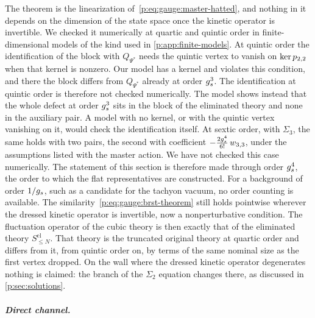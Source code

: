The theorem is the linearization of~\eqref{p:eq:gauge:master-hatted}, and nothing in it depends on the dimension of the state space once the kinetic operator is invertible.
We checked it numerically at quartic and quintic order in finite-dimensional models of the kind used in \cref{p:app:finite-models}.
At quintic order the identification of the block with $Q_{\Psi^*}$ needs the quintic vertex to vanish on $\ker p_{2,2}$ when that kernel is nonzero.
Our model has a kernel and violates this condition, and there the block differs from $Q_{\Psi^*}$ already at order $g_s^3$.
The identification at quintic order is therefore not checked numerically.
  The model shows instead that the whole defect at order $g_s^3$ sits in the block of the eliminated theory and none in the auxiliary pair.
  A model with no kernel, or with the quintic vertex vanishing on it, would check the identification itself.
At sextic order, with $\Sigma_3$, the same holds with two pairs, the second with coefficient $- \tfrac{2 g_s^4}{6!} \, w_{3,3}$, under the assumptions listed with the master action.
We have not checked this case numerically.
The statement of this section is therefore made through order $g_s^4$, the order to which the flat representatives are constructed.
For a background of order $1 / g_s$, such as a candidate for the tachyon vacuum, no order counting is available.
The similarity~\eqref{p:eq:gauge:brst-theorem} still holds pointwise wherever the dressed kinetic operator is invertible, now a nonperturbative condition.
The fluctuation operator of the cubic theory is then exactly that of the eliminated theory $S^{\mathrm{el}}_{\le N}$.
That theory is the truncated original theory at quartic order and differs from it, from quintic order on, by terms of the same nominal size as the first vertex dropped.
On the wall where the dressed kinetic operator degenerates nothing is claimed: the branch of the $\Sigma_2$ equation changes there, as discussed in \cref{p:sec:solutions}.

\subparagraph{Direct channel.}

